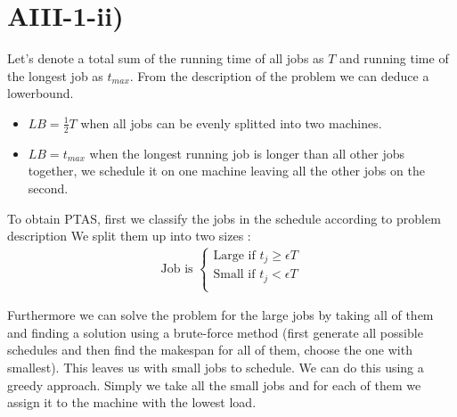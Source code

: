 \section*{AIII-1-ii)}
\label{approx-3-1-ii}

Let's denote a total sum of the running time of all jobs as $ T $ and running time of the longest job as $ t_{max} $.
From the description of the problem we can deduce a lowerbound.
\begin{itemize}
	\item $ LB = \frac{1}{2} T $ when all jobs can be evenly splitted into two machines.
	\item $ LB = t_{max} $ when the longest running job is longer than all other jobs together, we schedule it on one
		machine leaving all the other jobs on the second.
\end{itemize}

To obtain PTAS, first we classify the jobs in the schedule according to problem description
We split them up into two sizes :
\begin{align*}
    \text{Job is } \begin{cases}
        \text{Large} \text{ if } t_j \ge \epsilon T \\
        \text{Small} \text{ if } t_j < \epsilon T \\
    \end{cases}
\end{align*}

Furthermore we can solve the problem for the large jobs by taking all of them and finding a solution using a brute-force method
(first generate all possible schedules and then find the makespan for all of them, choose the one with smallest).
This leaves us with small jobs to schedule. We can do this using a greedy approach. Simply we take all the small jobs and for each
of them we assign it to the machine with the lowest load.

